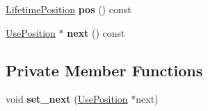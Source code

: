 \begin{DoxyCompactItemize}
\item 
\hyperlink{classv8_1_1internal_1_1_lifetime_position}{Lifetime\+Position} {\bfseries pos} () const \hypertarget{classv8_1_1internal_1_1_use_position_a0deec9e990d82cd40149d2d680ae592b}{}\label{classv8_1_1internal_1_1_use_position_a0deec9e990d82cd40149d2d680ae592b}

\item 
\hyperlink{classv8_1_1internal_1_1_use_position}{Use\+Position} $\ast$ {\bfseries next} () const \hypertarget{classv8_1_1internal_1_1_use_position_a564926fb1742aec1110a4aad1012984f}{}\label{classv8_1_1internal_1_1_use_position_a564926fb1742aec1110a4aad1012984f}

\end{DoxyCompactItemize}
\subsection*{Private Member Functions}
\begin{DoxyCompactItemize}
\item 
void {\bfseries set\+\_\+next} (\hyperlink{classv8_1_1internal_1_1_use_position}{Use\+Position} $\ast$next)\hypertarget{classv8_1_1internal_1_1_use_position_a24359fe4afc164fed3eb6eaf41e68aca}{}\label{classv8_1_1internal_1_1_use_position_a24359fe4afc164fed3eb6eaf41e68aca}

\end{DoxyCompactItemize}

